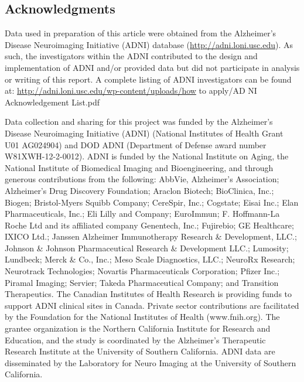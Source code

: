 \documentclass[12pt,]{article}
\begin{document}
\clearpage

\hypertarget{acknowledgments}{%
\subsection*{Acknowledgments}\label{acknowledgments}}

Data used in preparation of this article were obtained from the
Alzheimer's Disease Neuroimaging Initiative (ADNI) database
(\url{http://adni.loni.usc.edu}). As such, the investigators within the
ADNI contributed to the design and implementation of ADNI and/or
provided data but did not participate in analysis or writing of this
report. A complete listing of ADNI investigators can be found at:
\url{http://adni.loni.usc.edu/wp-content/uploads/how} to apply/AD NI
Acknowledgement List.pdf

Data collection and sharing for this project was funded by the
Alzheimer's Disease Neuroimaging Initiative (ADNI) (National Institutes
of Health Grant U01 AG024904) and DOD ADNI (Department of Defense award
number W81XWH-12-2-0012). ADNI is funded by the National Institute on
Aging, the National Institute of Biomedical Imaging and Bioengineering,
and through generous contributions from the following: AbbVie,
Alzheimer's Association; Alzheimer's Drug Discovery Foundation; Araclon
Biotech; BioClinica, Inc.; Biogen; Bristol-Myers Squibb Company;
CereSpir, Inc.; Cogstate; Eisai Inc.; Elan Pharmaceuticals, Inc.; Eli
Lilly and Company; EuroImmun; F. Hoffmann-La Roche Ltd and its
affiliated company Genentech, Inc.; Fujirebio; GE Healthcare; IXICO
Ltd.; Janssen Alzheimer Immunotherapy Research \& Development, LLC.;
Johnson \& Johnson Pharmaceutical Research \& Development LLC.;
Lumosity; Lundbeck; Merck \& Co., Inc.; Meso Scale Diagnostics, LLC.;
NeuroRx Research; Neurotrack Technologies; Novartis Pharmaceuticals
Corporation; Pfizer Inc.; Piramal Imaging; Servier; Takeda
Pharmaceutical Company; and Transition Therapeutics. The Canadian
Institutes of Health Research is providing funds to support ADNI
clinical sites in Canada. Private sector contributions are facilitated
by the Foundation for the National Institutes of Health (www.fnih.org).
The grantee organization is the Northern California Institute for
Research and Education, and the study is coordinated by the Alzheimer's
Therapeutic Research Institute at the University of Southern California.
ADNI data are disseminated by the Laboratory for Neuro Imaging at the
University of Southern California. \newpage
\end{document}
